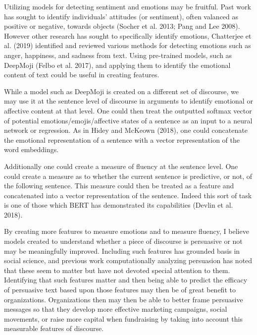 \documentclass[11pt,a4paper]{article}
\begin{document}
Utilizing models for detecting sentiment and emotions may be fruitful. Past work has sought to identify individuals' attitudes (or sentiment), often valanced as positive or negative, towards objects (Socher et al. 2013; Pang and Lee 2008). However other research has sought to specifically identify emotions,  Chatterjee et al. (2019) identified and reviewed various methods for detecting emotions such as anger, happiness, and sadness from text. Using pre-trained models, such as DeepMoji (Felbo et al. 2017), and applying them to identify the emotional content of text could be useful in creating features. 

While a model such as DeepMoji is created on a different set of discourse, we may use it at the sentence level of discourse in arguments to identify emotional or affective content at that level. One could then treat the outputted softmax vector of potential emotions/emojis/affective states of a sentence as an input to a neural network or regression. As in Hidey and McKeown (2018), one could concatenate the emotional representation of a sentence with a vector representation of the word embeddings.

Additionally one could create a measure of fluency at the sentence level. One could create a measure as to whether the current sentence is predictive, or not, of the following sentence. This measure could then be treated as a feature and concatenated into a vector representation of the sentence. Indeed this sort of task is one of those which  BERT has demonstrated its  capabilities (Devlin et al. 2018).

By creating more features to measure emotions and to measure fluency, I believe models created to understand whether a piece of discourse is persuasive or not may be meaningfully improved. Including such features has grounded basis in social science, and previous work computationally analyzing persuasion has noted that these seem to  matter but have not devoted special attention to them. Identifying that such features matter and then being able to predict the efficacy of persuasive text based upon those features may then be of great benefit to organizations. Organizations then may then be able to better frame persuasive messages so that they develop more effective marketing campaigns, social movements, or raise more capital when fundraising by taking into account this measurable features of discourse.
\end{document}
